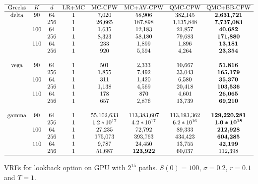 \begin{table}[H]
\centering
$\begin{array}{ c c c c c c c c } 
 \hline
 \text{Greeks} & K & d & \text{LR+MC} & \text{MC-CPW} & \text{MC+AV-CPW} & \text{QMC-CPW} & \text{QMC+BB-CPW} \\
 \hline
 \text{delta} & 90  & 64  & 1 & 7{,}020  & 58{,}906  & 382{,}145     & \boldsymbol{2{,}631{,}721} \\ 
              &     & 256 & 1 & 26{,}665 & 187{,}898 & 1{,}135{,}848 & \boldsymbol{7{,}737{,}083} \\
              & 100 & 64  & 1 & 1{,}635  & 12{,}183  & 21{,}857      & \boldsymbol{40{,}682} \\
              &     & 256 & 1 & 8{,}323  & 58{,}180  & 79{,}683      & \boldsymbol{171{,}880} \\
              & 110 & 64  & 1 & 233      & 1{,}899   & 1{,}896       & \boldsymbol{13{,}181} \\
              &     & 256 & 1 & 920      & 5{,}594   & 4{,}264       & \boldsymbol{23{,}354} \\
 \\
 \text{vega} & 90  & 64  & 1 & 501     & 2{,}333 & 10{,}667 & \boldsymbol{51{,}816} \\ 
             &     & 256 & 1 & 1{,}855 & 7{,}492 & 33{,}043 & \boldsymbol{165{,}179} \\
             & 100 & 64  & 1 & 311     & 1{,}420 & 6{,}580  & \boldsymbol{35{,}370} \\
             &     & 256 & 1 & 1{,}138 & 4{,}569 & 20{,}418 & \boldsymbol{103{,}536} \\
             & 110 & 64  & 1 & 178     & 870     & 4{,}601  & \boldsymbol{26{,}065} \\
             &     & 256 & 1 & 657     & 2{,}876 & 13{,}739 & \boldsymbol{69{,}210} \\
 \\
 \text{gamma} & 90  & 64  & 1 & 55{,}102{,}633 & 113{,}383{,}607 & 113{,}193{,}362 & \boldsymbol{129{,}220{,}281} \\ 
              &     & 256 & 1 & 1.2 * 10^{17}  & 4.2 * 10^{17}          & 6.2 * 10^{16}   & \boldsymbol{1.0 * 10^{18}} \\
              & 100 & 64  & 1 & 27{,}235       & 72{,}792               & 89{,}333        & \boldsymbol{212{,}928} \\
              &     & 256 & 1 & 175{,}073      & 393{,}763              & 434{,}423       & \boldsymbol{604{,}285} \\
              & 110 & 64  & 1 & 9{,}787        & 24{,}450               & 13{,}755        & \boldsymbol{42{,}199} \\
              &     & 256 & 1 & 51{,}687       & \boldsymbol{123{,}922} & 60{,}037        & 112{,}398 \\
 \hline
\end{array}$
\caption{VRFs for lookback option on GPU with $2^{15}$ paths. $S(0) = 100$, $\sigma = 0.2$, $r = 0.1$ and $T = 1$.}
\label{tbl:vrfs-lookback}
\end{table}

